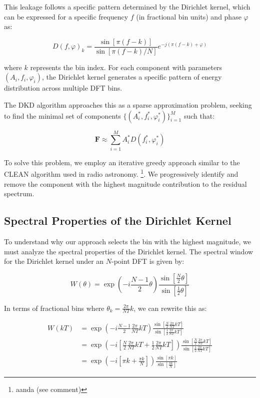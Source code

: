 \documentclass[11pt,twoside]{report}
\numberwithin{thm}{section}
\numberwithin{equation}{section}
\begin{document}
This leakage follows a specific pattern determined by the Dirichlet kernel, which can be expressed for a specific frequency $f$ (in fractional bin units) and phase $\varphi$ as:

\begin{equation}
\label{eq:dirichlet_kernel}
D(f, \varphi)_k = \frac{\sin[\pi (f - k)]}{\sin[\pi (f - k)/N]} e^{-j(\pi (f - k) + \varphi)}
\end{equation}

where $k$ represents the bin index. For each component with parameters $(A_i, f_i, \varphi_i)$, the Dirichlet kernel generates a specific pattern of energy distribution across multiple DFT bins.

The DKD algorithm approaches this as a sparse approximation problem, seeking to find the minimal set of components $\{(A_i^*, f_i^*, \varphi_i^*)\}_{i=1}^M$ such that:

\begin{equation}
\label{eq:sparse_approximation}
\mathbf{F} \approx \sum_{i=1}^{M} A_i^* D(f_i^*, \varphi_i^*)
\end{equation}

To solve this problem, we employ an iterative greedy approach similar to the CLEAN algorithm used in radio astronomy.
\footnote{
aanda (see comment)
}.
We progressively identify and remove the component with the highest magnitude contribution to the residual spectrum.

\subsection{Spectral Properties of the Dirichlet Kernel}

To understand why our approach selects the bin with the highest magnitude, we must analyze the spectral properties of the Dirichlet kernel. The spectral window for the Dirichlet kernel under an $N$-point DFT is given by:

\begin{equation}
\label{eq:dirichlet_window}
W(\theta) = \exp\left(-i\frac{N-1}{2}\theta\right)\frac{\sin\left[\frac{N}{2}\theta\right]}{\sin\left[\frac{1}{2}\theta\right]}
\end{equation}

In terms of fractional bins where $\theta_k = \frac{2\pi}{NT}k$, we can rewrite this as:

\begin{align}
\label{eq:dirichlet_window_fractional}
W(kT) &= \exp\left(-i\frac{N-1}{2}\frac{2\pi}{NT}kT\right)\frac{\sin\left[\frac{N}{2}\frac{2\pi}{NT}kT\right]}{\sin\left[\frac{1}{2}\frac{2\pi}{NT}kT\right]}\\
&= \exp\left(-i\left[\frac{N}{2}\frac{2\pi}{NT}kT + \frac{1}{2}\frac{2\pi}{NT}kT\right]\right)\frac{\sin\left[\frac{N}{2}\frac{2\pi}{NT}kT\right]}{\sin\left[\frac{1}{2}\frac{2\pi}{NT}kT\right]} \\
&= \exp\left(-i\left[\pi k + \frac{\pi k}{N}\right]\right)\frac{\sin\left[\pi k\right]}{\sin\left[\frac{\pi k}{N}\right]}
\end{align}
\end{document}
